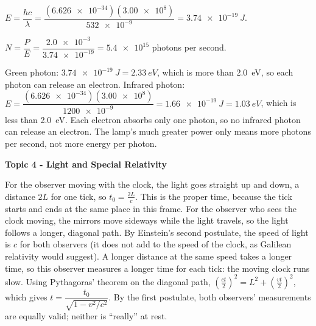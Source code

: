 \documentclass[12pt]{article}
\newcommand\anstopic[1]{\par\Needspace{8\baselineskip}\vspace{4mm}%
  \begin{center}{\headfont\bfseries\fontsize{14}{18}\selectfont #1\par}\end{center}\vspace{2pt}}
\begin{document}
\ansq
{}
\begin{crit}
\end{crit}
\sample
$E = \dfrac{hc}{\lambda} = \dfrac{(\num{6.626e-34})(\num{3.00e8})}{\num{532e-9}} = \qty{3.74e-19}{J}$.
\begin{crit}
\end{crit}
\sample
$N = \dfrac{P}{E} = \dfrac{\num{2.0e-3}}{\num{3.74e-19}} = \num{5.4e15}$ photons per second.
\begin{crit}
\end{crit}
\sample
Green photon: $\qty{3.74e-19}{J} = \qty{2.33}{eV}$, which is more than \qty{2.0}{eV}, so each photon can
release an electron. Infrared photon:
$E = \dfrac{(\num{6.626e-34})(\num{3.00e8})}{\num{1200e-9}} = \qty{1.66e-19}{J} = \qty{1.03}{eV}$, which is
less than \qty{2.0}{eV}. Each electron absorbs only one photon, so no infrared photon can release an
electron. The lamp's much greater power only means more photons per second, not more energy per photon.

\anstopic{Topic 4 - Light and Special Relativity}

\ansq
\begin{crit}
\end{crit}
\sample
For the observer moving with the clock, the light goes straight up and down, a distance $2L$ for one tick,
so $t_0 = \frac{2L}{c}$. This is the proper time, because the tick starts and ends at the same place in
this frame. For the observer who sees the clock moving, the mirrors move sideways while the light travels,
so the light follows a longer, diagonal path. By Einstein's second postulate, the speed of light is $c$ for
both observers (it does not add to the speed of the clock, as Galilean relativity would suggest). A longer
distance at the same speed takes a longer time, so this observer measures a longer time for each tick: the
moving clock runs slow. Using Pythagoras' theorem on the diagonal path,
$\left(\frac{ct}{2}\right)^2 = L^2 + \left(\frac{vt}{2}\right)^2$, which gives
$t = \dfrac{t_0}{\sqrt{1 - v^2/c^2}}$. By the first postulate, both observers' measurements are equally
valid; neither is ``really'' at rest.
\end{document}
